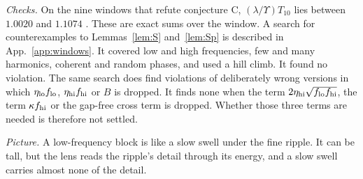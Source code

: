 \emph{Checks.}
On the nine windows that refute conjecture C, $(\lambda/\Upsilon)T_{10}$ lies between $1.0020$ and $1.1074$ \numst.
These are exact sums over the window.
A search for counterexamples to Lemmas~\ref{lem:S} and~\ref{lem:Sp} is described in App.~\ref{app:windows}.
It covered low and high frequencies, few and many harmonics, coherent and random phases, and used a hill climb.
It found no violation.
The same search does find violations of deliberately wrong versions in which $\eta_{\rm lo}f_{\rm lo}$, $\eta_{\rm hi}f_{\rm hi}$ or $B$ is dropped.
It finds none when the term $2\eta_{\rm hi}\sqrt{f_{\rm lo}f_{\rm hi}}$, the term $\kappa f_{\rm hi}$ or the gap-free cross term is dropped.
Whether those three terms are needed is therefore not settled.

\emph{Picture.} A low-frequency block is like a slow swell under the fine ripple.
It can be tall, but the lens reads the ripple's detail through its energy, and a slow swell carries almost none of the detail.
